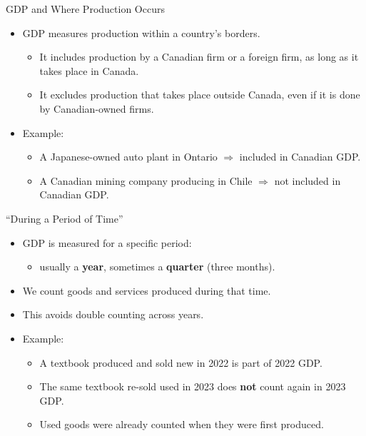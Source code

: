 \documentclass[aspectratio=169]{beamer}
\begin{document}
\begin{frame}{GDP and Where Production Occurs}
\transfade
\begin{itemize}[<+->]
  \item GDP measures production within a \alert{country's borders}.
  \begin{itemize}[<+->]
    \item It includes production by a Canadian firm or a foreign firm, as long as it takes place in Canada.
    \item It excludes production that takes place outside Canada, even if it is done by Canadian-owned firms.
  \end{itemize}
  \item Example:
  \begin{itemize}[<+->]
    \item A Japanese-owned auto plant in Ontario \(\Rightarrow\) included in Canadian GDP.
    \item A Canadian mining company producing in Chile \(\Rightarrow\) not included in Canadian GDP.
  \end{itemize}
\end{itemize}
\end{frame}

\begin{frame}{``During a Period of Time''}
\transfade
\begin{itemize}[<+->]
  \item GDP is measured for a specific period:
  \begin{itemize}[<+->]
    \item usually a \textbf{year}, sometimes a \textbf{quarter} (three months).
  \end{itemize}
  \item We count goods and services \alert{produced during} that time.
  \item This avoids double counting across years.
  \item Example:
  \begin{itemize}[<+->]
    \item A textbook produced and sold new in 2022 is part of 2022 GDP.
    \item The same textbook re-sold used in 2023 does \textbf{not} count again in 2023 GDP.
    \item Used goods were already counted when they were first produced.
  \end{itemize}
\end{itemize}
\end{frame}
\end{document}
